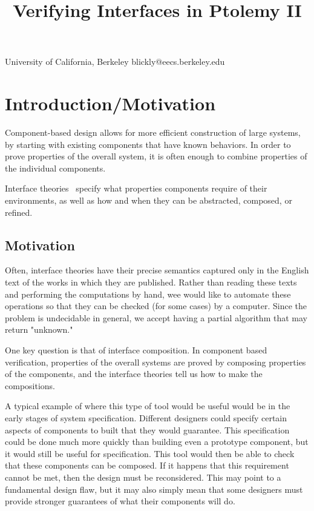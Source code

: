 \documentclass[preprint,11pt,authoryear]{sigplanconf}
\begin{document}
\title{Verifying Interfaces in Ptolemy II}

           {University of California, Berkeley}
           {blickly@eecs.berkeley.edu}

\maketitle

\newcommand{\fixme}[1]{\textcolor{red}{(FIXME: #1)}}

\begin{abstract}
\end{abstract}

\section{Introduction/Motivation}
Component-based design allows for more efficient construction of large systems, by starting with existing components that have known behaviors.  In order to prove properties of the overall system, it is often enough to combine properties of the individual components.

Interface theories~\cite{interfaceTheories} specify what properties components require of their environments, as well as how and when they can be abstracted, composed, or refined.
\subsection{Motivation}
Often, interface theories have their precise semantics captured only in the English text of the works in which they are published.
Rather than reading these texts and performing the computations by hand, wee would like to automate these operations so that they can be checked (for some cases) by a computer.
Since the problem is undecidable in general, we accept having a partial algorithm that may return "unknown."

One key question is that of interface composition.  In component based verification, properties of the overall systems are proved by composing properties of the components, and the interface theories tell us how to make the compositions.

A typical example of where this type of tool would be useful would be in the early stages of system specification.
Different designers could specify certain aspects of components to built that they would guarantee.
This specification could be done much more quickly than building even a prototype component, but it would still be useful for specification.
This tool would then be able to check that these components can be composed.
If it happens that this requirement cannot be met, then the design must be reconsidered.
This may point to a fundamental design flaw, but it may also simply mean that some designers must provide stronger guarantees of what their components will do.
\end{document}
